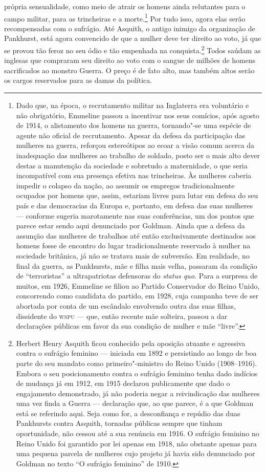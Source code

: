 própria sensualidade, como meio de atrair os homens ainda relutantes
para o campo militar, para as trincheiras e a morte.\footnote{Dado que,
  na época, o recrutamento militar na Inglaterra era voluntário e não
  obrigatório, Emmeline passou a incentivar nos seus comícios, após
  agosto de 1914, o alistamento dos homens na guerra, tornando"-se uma
  espécie de agente não oficial de recrutamento. Apesar da defesa da
  participação das mulheres na guerra, reforçou estereótipos ao ecoar a
  visão comum acerca da inadequação das mulheres ao trabalho de soldado,
  posto ser o mais alto dever destas a manutenção da
  sociedade e sobretudo a maternidade, o que seria incompatível com sua
  presença efetiva nas trincheiras. Às mulheres caberia impedir o
  colapso da nação, ao assumir os empregos tradicionalmente ocupados por
  homens que, assim, estariam livres para lutar em defesa do seu país e
  das democracias da Europa e, portanto, em defesa das suas mulheres --- conforme sugeria marotamente nas suas conferências, um dos pontos que
  parece estar sendo aqui denunciado por Goldman. Ainda que a defesa da
  assunção das mulheres de trabalhos até então exclusivamente destinados
  aos homens fosse de encontro do lugar tradicionalmente reservado à
  mulher na sociedade britânica, já não se tratava mais de subversão. Em
  realidade, no final da guerra, as Pankhursts, mãe e filha mais velha,
  passaram da condição de ``terroristas'' a ultrapatriotas defensoras do
  \emph{status quo.} Para a surpresa de muitos, em 1926, Emmeline
  se filiou ao Partido Conservador do Reino Unido, concorrendo como
  candidata do partido, em 1928, cuja campanha teve de ser abortada por
  conta de um escândalo envolvendo outra das suas filhas, dissidente do
  \textsc{wspu} --- que, então recente mãe solteira, passou a dar declarações
  públicas em favor da sua condição de mulher e mãe ``livre''.} Por tudo
isso, agora elas serão recompensadas ​​com o sufrágio. Até Asquith, o
antigo inimigo da organização de Pankhurst, está agora convencido de que
a mulher deve ter direito ao voto, já que se provou tão feroz no seu
ódio e tão empenhada na conquista.\footnote{Herbert Henry Asquith ficou
  conhecido pela oposição atuante e agressiva contra o sufrágio feminino
  --- iniciada em 1892 e persistindo ao longo de boa parte do seu mandato
  como primeiro"-ministro do Reino Unido (1908--1916). Embora o seu
  posicionamento contra o sufrágio feminino tenha dado indícios de
  mudança já em 1912, em 1915 declarou publicamente que dado o
  engajamento demonstrado, já não poderia negar a reivindicação das
  mulheres uma vez finda a Guerra --- declaração que, ao que parece, é a
  que Goldman está se referindo aqui. Seja como for, a desconfiança e
  repúdio das duas Pankhursts contra Asquith, tornadas públicas sempre
  que tinham oportunidade, não cessou até a sua renúncia em 1916. O
  sufrágio feminino no Reino Unido foi garantido por lei apenas em 1918,
  não obstante apenas para uma pequena parcela de mulheres cujo projeto
  já havia sido denunciado por Goldman no texto ``O sufrágio feminino''
  de 1910.} Todos saúdam as inglesas que compraram seu direito ao voto
com o sangue de milhões de homens sacrificados ao monstro Guerra. O
preço é de fato alto, mas também altos serão os cargos reservados para
as damas da política.

